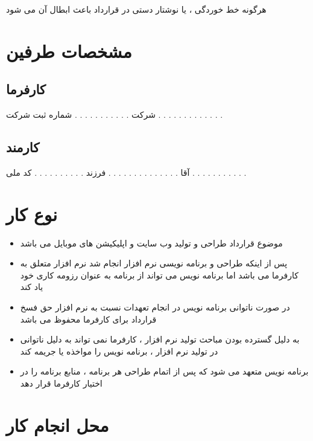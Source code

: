 \documentclass[12pt]{article}
\begin{document}
\begin{tcolorbox}[
title=تبصره 1
]
هرگونه خط خوردگی ، یا نوشتار دستی در قرارداد باعث ابطال آن می شود 
\end{tcolorbox}




\section{مشخصات طرفین}


\subsection{کارفرما}


شرکت  . . . . . . . . . . .  شماره ثبت شرکت . . . . . . . . . . . . .

\subsection{کارمند}


آقا . . . . . . . . . . . . . . فرزند . . . . . . . . . .  کد ملی . . . . . . . . . . .



\section{نوع کار}


\begin{itemize}
	\item موضوع قرارداد طراحی و تولید وب سایت و اپلیکیشن های موبایل می باشد
	\item  پس از اینکه طراحی و برنامه نویسی نرم افزار انجام شد 
	نرم افزار متعلق به کارفرما می باشد اما برنامه نویس می تواند از برنامه به عنوان رزومه کاری خود یاد کند
	\item در صورت ناتوانی برنامه نویس در انجام تعهدات نسبت به نرم افزار حق فسخ قرارداد برای کارفرما محفوظ می باشد
	\item به دلیل گسترده بودن مباحث تولید نرم افزار ، 
	کارفرما نمی تواند به دلیل ناتوانی در تولید نرم افزار ، برنامه نویس را مواخذه یا جریمه کند
	\item برنامه نویس متعهد می شود که پس از اتمام طراحی هر برنامه   ، منابع برنامه را در اختیار کارفرما قرار دهد
\end{itemize}



\section{محل انجام کار}
\end{document}
